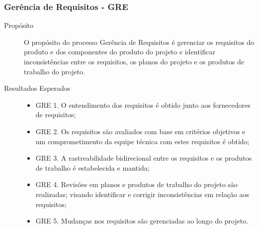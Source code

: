     \subsubsection{Gerência de Requisitos - GRE}
      \begin{description}
        \item[Propósito]

      O propósito do processo Gerência de Requisitos é gerenciar os requisitos do
      produto e dos componentes do produto do projeto e identificar inconsistências
      entre os requisitos, os planos do projeto e os produtos de trabalho do projeto.

      \item [Resultados Esperados]

      \begin{itemize}
        \item GRE 1. O entendimento dos requisitos é obtido junto aos fornecedores de requisitos;
        \item GRE 2. Os requisitos são avaliados com base em critérios objetivos e um comprometimento
              da equipe técnica com estes requisitos é obtido;
        \item GRE 3. A rastreabilidade bidirecional entre os requisitos e os produtos de trabalho
              é estabelecida e mantida;
        \item GRE 4. Revisões em planos e produtos de trabalho do projeto são realizadas;
              visando identificar e corrigir inconsistências em relação aos requisitos;
        \item GRE 5. Mudanças nos requisitos são gerenciadas ao longo do projeto.
      \end{itemize}
    \end{description}

